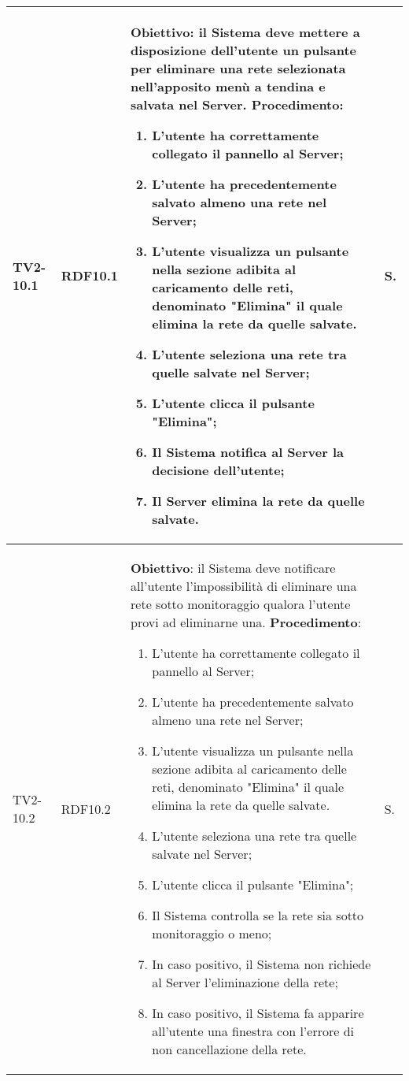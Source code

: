 \begin{longtable}{|C{.15\textwidth}|C{.13\textwidth}|m{.65\textwidth}|C{.08\textwidth}|}
TV2-10.1 & RDF10.1 &
	\textbf{Obiettivo}: il Sistema deve mettere a disposizione dell'utente un pulsante per eliminare una rete selezionata nell'apposito menù a tendina e salvata nel Server. \newline
	\textbf{Procedimento}:
	\begin{enumerate}
		\item L'utente ha correttamente collegato il pannello al Server;
		\item L'utente ha precedentemente salvato almeno una rete nel Server;
		\item L'utente visualizza un pulsante nella sezione adibita al caricamento delle reti, denominato "Elimina" il quale elimina la rete da quelle salvate.
		\item L'utente seleziona una rete tra quelle salvate nel Server;
		\item L'utente clicca il pulsante "Elimina";
		\item Il Sistema notifica al Server la decisione dell'utente;
		\item Il Server elimina la rete da quelle salvate.
	\end{enumerate}
	& S. \\
\hline

TV2-10.2 & RDF10.2 &
	\textbf{Obiettivo}: il Sistema deve notificare all'utente l'impossibilità di eliminare una rete sotto monitoraggio qualora l'utente provi ad eliminarne una. \newline
	\textbf{Procedimento}:
	\begin{enumerate}
		\item L'utente ha correttamente collegato il pannello al Server;
		\item L'utente ha precedentemente salvato almeno una rete nel Server;
		\item L'utente visualizza un pulsante nella sezione adibita al caricamento delle reti, denominato "Elimina" il quale elimina la rete da quelle salvate.
		\item L'utente seleziona una rete tra quelle salvate nel Server;
		\item L'utente clicca il pulsante "Elimina";
		\item Il Sistema controlla se la rete sia sotto monitoraggio o meno;
		\item In caso positivo, il Sistema non richiede al Server l'eliminazione della rete;
		\item In caso positivo, il Sistema fa apparire all'utente una finestra con l'errore di non cancellazione della rete.
	\end{enumerate}
	& S. \\
\hline


\end{longtable}
